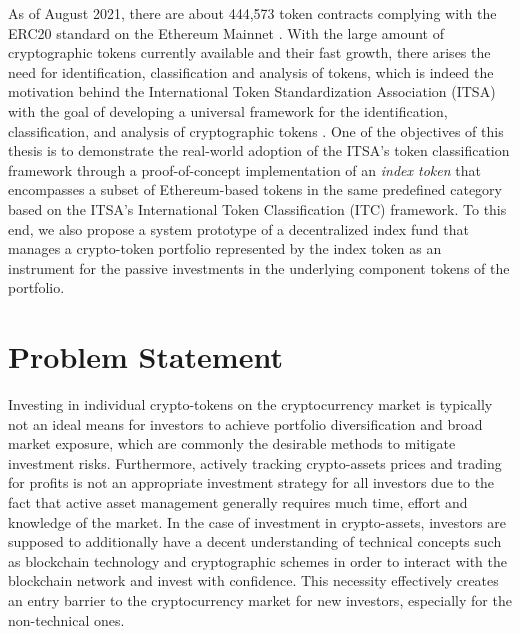 As of August 2021, there are about 444,573 token contracts complying with the ERC20 standard on the Ethereum Mainnet \cite{etherscantokentracker}. With the large amount of cryptographic tokens currently available and their fast growth, there arises the need for identification, classification and analysis of tokens, which is indeed the motivation behind the International Token Standardization Association (ITSA) with the goal of developing a universal framework for the identification, classification, and analysis of cryptographic tokens \cite{itsadefinition}. One of the objectives of this thesis is to demonstrate the real-world adoption of the ITSA's token classification framework through a proof-of-concept implementation of an \textit{index token} that encompasses a subset of Ethereum-based tokens in the same predefined category based on the ITSA's International Token Classification (ITC) framework. To this end, we also propose a system prototype of a decentralized index fund that manages a crypto-token portfolio represented by the index token as an instrument for the passive investments in the underlying component tokens of the portfolio.

\section{Problem Statement}

Investing in individual crypto-tokens on the cryptocurrency market is typically not an ideal means for investors to achieve portfolio diversification and broad market exposure, which are commonly the desirable methods to mitigate investment risks. Furthermore, actively tracking crypto-assets prices and trading for profits is not an appropriate investment strategy for all investors due to the fact that active asset management generally requires much time, effort and knowledge of the market. In the case of investment in crypto-assets, investors are supposed to additionally have a decent understanding of technical concepts such as blockchain technology and cryptographic schemes in order to interact with the blockchain network and invest with confidence. This necessity effectively creates an entry barrier to the cryptocurrency market for new investors, especially for the non-technical ones.

